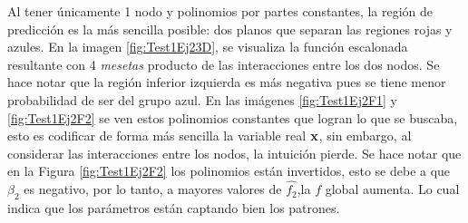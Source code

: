 \documentclass[../Main/Main.tex]{subfiles}
\begin{document}
Al tener únicamente 1 nodo y polinomios por partes constantes, la región de predicción es la más sencilla posible: dos planos que separan las regiones rojas y azules. En la imagen \ref{fig:Test1Ej23D}, se visualiza la función escalonada resultante con 4 \textit{mesetas} producto de las interacciones entre los dos nodos. Se hace notar que la región inferior izquierda es más negativa pues se tiene menor probabilidad de ser del grupo azul. En las imágenes \ref{fig:Test1Ej2F1} y \ref{fig:Test1Ej2F2} se ven estos polinomios constantes que logran lo que se buscaba, esto es codificar de forma más sencilla la variable real $\mathbf{x}$, sin embargo, al considerar las interacciones entre los nodos, la intuición pierde. Se hace notar que en la Figura \ref{fig:Test1Ej2F2} los polinomios están invertidos, esto se debe a que $\beta_2$ es negativo, por lo tanto, a mayores valores de $\hat{f_2}$,la $f$ global aumenta. Lo cual indica que los parámetros están captando bien los patrones.\\
\end{document}
